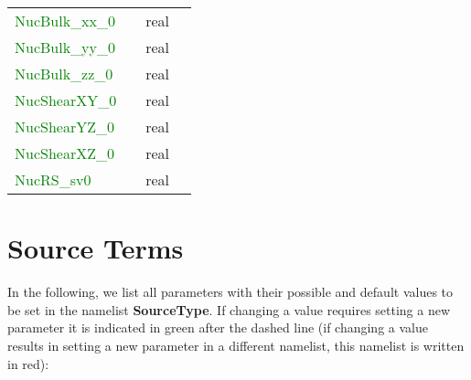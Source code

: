 \documentclass[12pt,twoside]{article}
\begin{document}
\begin{table}[H]
\begin{center}
\begin{tabular}{|p{4.8cm}|p{2.4cm}|p{2cm}|p{5cm}|}
\textcolor{green}{NucBulk\_xx\_0} & & real & \\
\textcolor{green}{NucBulk\_yy\_0} & & real & \\
\textcolor{green}{NucBulk\_zz\_0} & & real & \\
\textcolor{green}{NucShearXY\_0} & & real & \\
\textcolor{green}{NucShearYZ\_0} & & real & \\
\textcolor{green}{NucShearXZ\_0} & & real & \\
\textcolor{green}{NucRS\_sv0} & & real & \\
\hline
\end{tabular}
\end{center}
\label{nuc-table}
\end{table}

\newpage

\section{Source Terms}
\label{sec-block-src}

In the following, we list all parameters with their possible and default values to be set in the namelist \textbf{SourceType}.
If changing a value requires setting a new 
parameter it is indicated in green after the dashed line (if changing a value results in setting a new 
parameter in a different namelist, this namelist is written in red):\\
\end{document}
